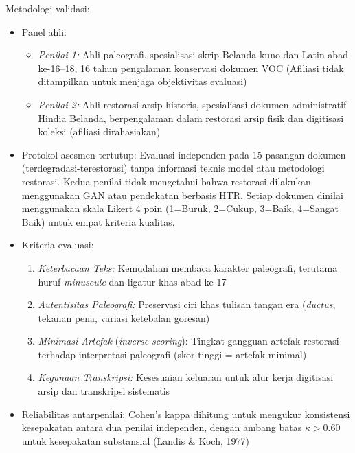 \documentclass[journal]{IEEEtran}
\begin{document}
Metodologi validasi:
\begin{itemize}
    \item Panel ahli: 
    \begin{itemize}
        \item[$-$] \textit{Penilai 1:} Ahli paleografi, spesialisasi skrip Belanda kuno dan Latin abad ke-16--18, 16 tahun pengalaman konservasi dokumen VOC (Afiliasi tidak ditampilkan untuk menjaga objektivitas evaluasi)
        \item[$-$] \textit{Penilai 2:} Ahli restorasi arsip historis, spesialisasi dokumen administratif Hindia Belanda, berpengalaman dalam restorasi arsip fisik dan digitisasi koleksi (afiliasi dirahasiakan)
    \end{itemize}
    \item Protokol asesmen tertutup: Evaluasi independen pada 15 pasangan dokumen (terdegradasi-terestorasi) tanpa informasi teknis model atau metodologi restorasi. Kedua penilai tidak mengetahui bahwa restorasi dilakukan menggunakan GAN atau pendekatan berbasis HTR. Setiap dokumen dinilai menggunakan skala Likert 4 poin (1=Buruk, 2=Cukup, 3=Baik, 4=Sangat Baik) untuk empat kriteria kualitas.
    \item Kriteria evaluasi:
    \begin{enumerate}
        \item \textit{Keterbacaan Teks:} Kemudahan membaca karakter paleografi, terutama huruf \textit{minuscule} dan ligatur khas abad ke-17
        \item \textit{Autentisitas Paleografi:} Preservasi ciri khas tulisan tangan era (\textit{ductus}, tekanan pena, variasi ketebalan goresan)
        \item \textit{Minimasi Artefak} (\textit{inverse scoring}): Tingkat gangguan artefak restorasi terhadap interpretasi paleografi (skor tinggi = artefak minimal)
        \item \textit{Kegunaan Transkripsi:} Kesesuaian keluaran untuk alur kerja digitisasi arsip dan transkripsi sistematis
    \end{enumerate}
    \item Reliabilitas antarpenilai: Cohen's kappa dihitung untuk mengukur konsistensi kesepakatan antara dua penilai independen, dengan ambang batas $\kappa > 0.60$ untuk kesepakatan substansial (Landis \& Koch, 1977)
\end{itemize}
\end{document}
